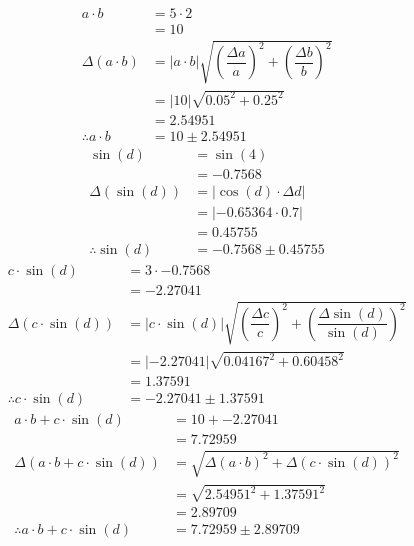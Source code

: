 \documentclass[a4paper]{article}
\begin{document}
\begin{align*}
a \cdot b &= 5 \cdot 2 \\
&= 10 \\[4mm]
\Delta \left( a \cdot b \right) &= \left| a \cdot b \right|\sqrt{ \left( \dfrac{ \Delta a }{ a } \right) ^ { 2 } + \left( \dfrac{ \Delta b }{ b } \right) ^ { 2 }} \\
&= \left| 10 \right|\sqrt{ 0.05 ^ { 2 } + 0.25 ^ { 2 }} \\
&= 2.54951\\[4mm]
\therefore a \cdot b &= 10 \pm 2.54951
\end{align*}
\begin{align*}
\sin \left( d \right) &= \sin \left( 4 \right) \\
&= -0.7568 \\[4mm]
\Delta \left( \sin \left( d \right) \right) &= \left| \cos \left( d \right) \cdot \Delta d \right| \\
&= \left| -0.65364 \cdot 0.7 \right| \\
&= 0.45755\\[4mm]
\therefore \sin \left( d \right) &= -0.7568 \pm 0.45755
\end{align*}
\begin{align*}
c \cdot \sin \left( d \right) &= 3 \cdot -0.7568 \\
&= -2.27041 \\[4mm]
\Delta \left( c \cdot \sin \left( d \right) \right) &= \left| c \cdot \sin \left( d \right) \right|\sqrt{ \left( \dfrac{ \Delta c }{ c } \right) ^ { 2 } + \left( \dfrac{ \Delta \sin \left( d \right) }{ \sin \left( d \right) } \right) ^ { 2 }} \\
&= \left| -2.27041 \right|\sqrt{ 0.04167 ^ { 2 } + 0.60458 ^ { 2 }} \\
&= 1.37591\\[4mm]
\therefore c \cdot \sin \left( d \right) &= -2.27041 \pm 1.37591
\end{align*}
\begin{align*}
a \cdot b + c \cdot \sin \left( d \right) &= 10 + -2.27041 \\
&= 7.72959 \\[4mm]
\Delta \left( a \cdot b + c \cdot \sin \left( d \right) \right) &= \sqrt{ \Delta \left( a \cdot b \right) ^ { 2 } + \Delta \left( c \cdot \sin \left( d \right) \right) ^ { 2 }} \\
&= \sqrt{ 2.54951 ^ { 2 } + 1.37591 ^ { 2 }} \\
&= 2.89709\\[4mm]
\therefore a \cdot b + c \cdot \sin \left( d \right) &= 7.72959 \pm 2.89709
\end{align*}
\end{document}
